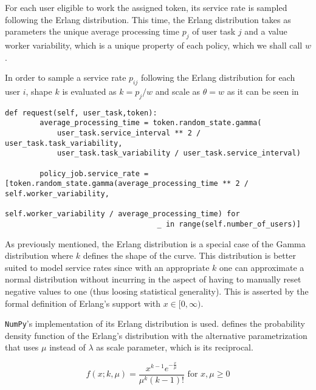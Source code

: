 For each user eligible to work the assigned token, its service rate is sampled following the Erlang distribution. This time, the Erlang distribution takes as parameters the unique average processing time $p_j$ of user task $j$ and a value worker variability, which is a unique property of each policy, which we shall call $w$.

In order to sample a service rate $p_{ij}$ following the Erlang distribution for each user $i$, shape $k$ is evaluated as $k=p_j/w$ and scale as $\theta = w$ as it can be seen in 

\begin{lstlisting}[caption=User service rate sampling following an Erlang distribution,label=lst:user_service_rate,style=CustomPython]
    def request(self, user_task,token):
        average_processing_time = token.random_state.gamma(
            user_task.service_interval ** 2 / user_task.task_variability,
            user_task.task_variability / user_task.service_interval)

        policy_job.service_rate = [token.random_state.gamma(average_processing_time ** 2 / self.worker_variability,
                                                           self.worker_variability / average_processing_time) for
                                   _ in range(self.number_of_users)]
\end{lstlisting}

As previously mentioned, the Erlang distribution is a special case of the Gamma distribution where $k$ defines the shape of the curve. This distribution is better suited to model service rates since with an appropriate $k$ one can approximate a normal distribution without incurring in the aspect of having to manually reset negative values to one (thus loosing statistical generality). This is asserted by the formal definition of Erlang's support with $x \in [0,\infty)$.

\texttt{NumPy}'s implementation of its Erlang distribution is used.  defines the probability density function of the Erlang's distribution with the alternative parametrization that uses $\mu$ instead of $\lambda$ as scale parameter, which is its reciprocal.

\begin{equation}
\label{eq:erlang_density}
	f(x;k,\mu) = \frac{x^{k-1} e^{-\frac{x}{\mu}}}{\mu^k (k-1)!} \text{ for } x,\mu \geq 0
\end{equation}